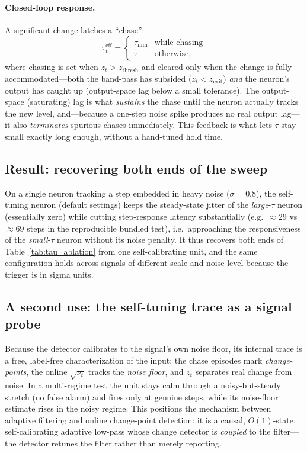 \documentclass[11pt]{article}
\begin{document}
\paragraph{Closed-loop response.} A significant change latches a ``chase'':
\begin{equation}
\tau^{\text{eff}}_t =
\begin{cases}
\tau_{\min} & \text{while chasing}\\
\tau & \text{otherwise,}
\end{cases}
\end{equation}
where chasing is set when $z_t > z_{\text{thresh}}$ and cleared only when the
change is fully accommodated---both the band-pass has subsided
($z_t < z_{\text{exit}}$) \emph{and} the neuron's output has caught up
(output-space lag below a small tolerance). The output-space (saturating)
lag is what \emph{sustains} the chase until the neuron actually tracks the new
level, and---because a one-step noise spike produces no real output lag---it
also \emph{terminates} spurious chases immediately. This feedback is what lets
$\tau$ stay small exactly long enough, without a hand-tuned hold time.

\subsection{Result: recovering both ends of the sweep}

On a single neuron tracking a step embedded in heavy noise
($\sigma = 0.8$), the self-tuning neuron (default settings) keeps the
steady-state jitter of the \emph{large}-$\tau$ neuron (essentially zero) while
cutting step-response latency substantially (e.g.\ $\approx$29 vs $\approx$69
steps in the reproducible bundled test), i.e.\ approaching the responsiveness of
the \emph{small}-$\tau$ neuron without its noise penalty. It thus recovers both
ends of Table~\ref{tab:tau_ablation} from one self-calibrating unit, and the
same configuration holds across signals of different scale and noise level
because the trigger is in sigma units.

\subsection{A second use: the self-tuning trace as a signal probe}

Because the detector calibrates to the signal's own noise floor, its internal
trace is a free, label-free characterization of the input: the chase episodes
mark \emph{change-points}, the online $\sqrt{\nu_t}$ tracks the \emph{noise
floor}, and $z_t$ separates real change from noise. In a multi-regime test the
unit stays calm through a noisy-but-steady stretch (no false alarm) and fires
only at genuine steps, while its noise-floor estimate rises in the noisy regime.
This positions the mechanism between adaptive filtering and online change-point
detection: it is a causal, $O(1)$-state, self-calibrating adaptive low-pass
whose change detector is \emph{coupled} to the filter---the detector retunes the
filter rather than merely reporting.
\end{document}
